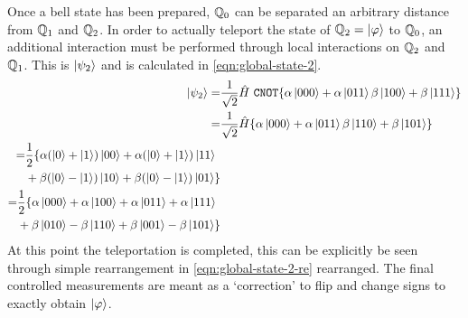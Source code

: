 \documentclass[reprint, amsmath,amssymb, aps]{revtex4-2}
\begin{document}
            Once a bell state has been prepared, $\mathbb{Q}_0$ can be separated an arbitrary distance from $\mathbb{Q}_1$ and $\mathbb{Q}_2$. In order to actually teleport the state of $\mathbb{Q}_2 = \ket{\varphi}$ to $\mathbb{Q}_0$, an additional interaction must be performed through local interactions on $\mathbb{Q}_2$ and $\mathbb{Q}_1$. This is $\ket{\psi_2}$ and is calculated in \eqref{eqn:global-state-2}.
            \begin{align}
                \ket{\psi_2} =& \frac{1}{\sqrt{2}}\hat{H}\ \texttt{CNOT}\{\alpha\ket{000} + \alpha\ket{011} \beta\ket{100} + \beta\ket{111}\} \\
                =& \frac{1}{\sqrt{2}}\hat{H} \{\alpha\ket{000} + \alpha\ket{011} \beta\ket{110} + \beta\ket{101}\} \\
                \begin{split}
                =& \frac{1}{2} \{\alpha(\ket{0}+\ket{1})\ket{00} + \alpha(\ket{0}+\ket{1})\ket{11} \\
                &+ \beta(\ket{0}-\ket{1})\ket{10} + \beta(\ket{0}-\ket{1})\ket{01}\} \\
                \end{split}\\
                \begin{split}
                =& \frac{1}{2} \{\alpha\ket{000} + \alpha\ket{100} + \alpha\ket{011}+\alpha\ket{111} \\
                &+ \beta\ket{010}-\beta\ket{110} + \beta\ket{001} -\beta\ket{101}\} \label{eqn:global-state-2}
                \end{split}
            \end{align}
            At this point the teleportation is completed, this can be explicitly be seen through simple rearrangement in \eqref{eqn:global-state-2-re} rearranged. The final controlled measurements are meant as a `correction' to flip and change signs to exactly obtain $\ket{\varphi}$.
        
\end{document}
